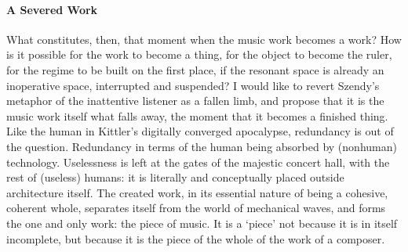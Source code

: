 





\paragraph{A Severed Work}
What constitutes, then, that moment when the music work becomes a work? How is it possible for the work to become a thing, for the object to become the ruler, for the regime to be built on the first place, if the resonant space is already an inoperative space, interrupted and suspended? I would like to revert Szendy's metaphor of the inattentive listener as a fallen limb, and propose that it is the music work itself what falls away, the moment that it becomes a finished thing. Like the human in Kittler's digitally converged apocalypse, redundancy is out of the question. Redundancy in terms of the human being absorbed by (nonhuman) technology. Uselessness is left at the gates of the majestic concert hall, with the rest of (useless) humans: it is literally and conceptually placed outside architecture itself. The created work, in its essential nature of being a cohesive, coherent whole, separates itself from the world of mechanical waves, and forms the one and only work: the piece of music. It is a `piece' not because it is in itself incomplete, but because it is the piece of the whole of the work of a composer.



